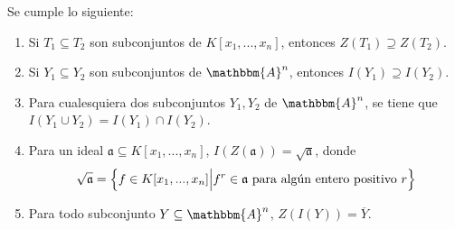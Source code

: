\documentclass[12pt]{report}
\theoremstyle{largebreak}
\newcommand{\bbm}[1]{\ensuremath{\mathbbm{#1}}}
\newcommand{\fk}[1]{\ensuremath{\mathfrak{#1}}}
\begin{document}
    \begin{propo}
        Se cumple lo siguiente:
        \begin{enumerate}[label=(\textit{\alph*})]
            \item Si $T_1\subseteq T_2$ son subconjuntos de $K[x_1,...,x_n]$, entonces $Z(T_1)\supseteq Z(T_2)$.
            \item Si $Y_1\subseteq Y_2$ son subconjuntos de $\bbm{A}^n$, entonces $I(Y_1)\supseteq I(Y_2)$.
            \item Para cualesquiera dos subconjuntos $Y_1,Y_2$ de $\bbm{A}^n$, se tiene que $I(Y_1\cup Y_2)=I(Y_1)\cap I(Y_2)$.
            \item Para un ideal $\fk{a}\subseteq K[x_1,...,x_n]$, $I(Z(\fk{a}))=\sqrt{\fk{a}}$, donde
            \begin{equation*}
                \sqrt{\fk{a}}=\left\{f\in K[x_1,...,x_n]\Big|f^r\in\fk{a}\textup{ para algún entero positivo }r \right\}
            \end{equation*}
            \item Para todo subconjunto $Y\subseteq\bbm{A}^n$, $Z(I(Y))=\overline{Y}$.
        \end{enumerate}
    \end{propo}
\end{document}
